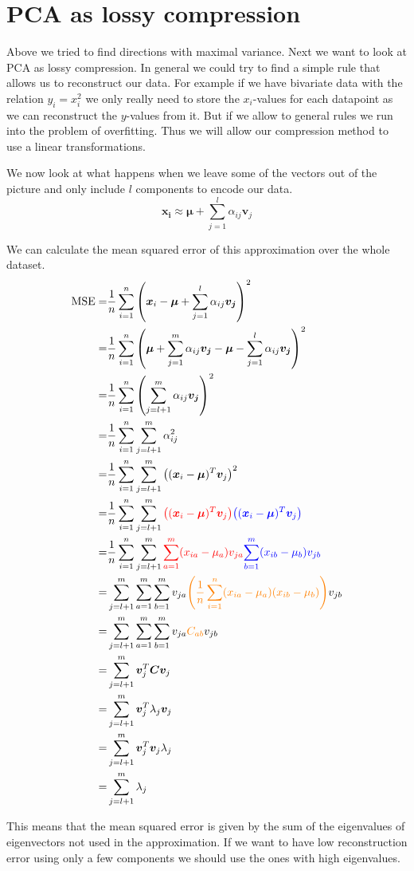 \section{PCA as lossy compression}
Above we tried to find directions with maximal variance.
Next we want to look at PCA as lossy compression.
In general we could try to find a simple rule that allows us to reconstruct our data.
For example if we have bivariate data with the relation $y_i = x_i^2$ we only really need to store the $x_i$-values
for each datapoint as we can reconstruct the $y$-values from it.
But if we allow to general rules we run into the problem of overfitting.
Thus we will allow our compression method to use a linear transformations.

We now look at what happens when we leave some of the vectors out of the picture and only include $l$ components to encode our data.
\begin{equation}
    \bm{x_i} \approx \bm{\mu} + \sum_{j=1}^l \alpha_{ij} \bm{v}_j
\end{equation}

We can calculate the mean squared error of this approximation over the whole dataset.
\begin{align}
    \text{MSE} =& \frac{1}{n} \sum_{i=1}^n \left(\bm{x}_i - \bm{\mu} + \sum_{j=1}^l \alpha_{ij} \bm{v_j}\right)^2 \\
    =& \frac{1}{n} \sum_{i=1}^n \left(\bm{\mu} + \sum_{j=1}^m \alpha_{ij} \bm{v_j} - \bm{\mu} - \sum_{j=1}^l \alpha_{ij} \bm{v_j}\right)^2 \\
    =& \frac{1}{n} \sum_{i=1}^n \left(\sum_{j=l+1}^m \alpha_{ij} \bm{v_j} \right)^2 \\
    =& \frac{1}{n} \sum_{i=1}^n \sum_{j=l+1}^m \alpha_{ij} ^2 \\
    =& \frac{1}{n} \sum_{i=1}^n \sum_{j=l+1}^{m} \left( (\bm{x}_i - \bm{\mu})^T \bm{v}_j \right)^2 \\
    =& \frac{1}{n} \sum_{i=1}^n \sum_{j=l+1}^{m} {\color{red} \left( (\bm{x}_i - \bm{\mu})^T \bm{v}_j \right)} {\color{blue} \left( (\bm{x}_i - \bm{\mu})^T \bm{v}_j \right)} \\
    =& \frac{1}{n} \sum_{i=1}^n \sum_{j=l+1}^{m} {\color{red} \sum_{a=1}^m (x_{ia} - \mu_a) v_{ja}} {\color{blue} \sum_{b=1}^m (x_{ib} - \mu_b) v_{jb}}\\
    =& \sum_{j=l+1}^{m} \sum_{a=1}^m \sum_{b=1}^m v_{ja} {\color{orange} \left(\frac{1}{n} \sum_{i=1}^n (x_{ia} - \mu_a) (x_{ib} - \mu_b) \right)} v_{jb}\\
    =& \sum_{j=l+1}^{m} \sum_{a=1}^m \sum_{b=1}^m v_{ja} {\color{orange} C_{ab}} v_{jb}\\
    =& \sum_{j=l+1}^{m} \bm{v}_j^T \bm{C} \bm{v}_j\\
    =& \sum_{j=l+1}^{m} \bm{v}_j^T \lambda_j \bm{v}_j\\
    =& \sum_{j=l+1}^{m} \bm{v}_j^T \bm{v}_j \lambda_j \\
    =& \sum_{j=l+1}^{m} \lambda_j \\
\end{align}

This means that the mean squared error is given by the sum of the eigenvalues of eigenvectors not used in the approximation.
If we want to have low reconstruction error using only a few components we should use the ones with high eigenvalues.










